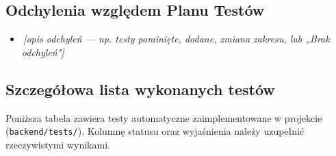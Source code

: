 \documentclass[11pt,a4paper]{article}
\newcommand{\luka}[1]{\colorbox{lukacol}{\,\textit{[#1]}\,}}
\begin{document}
\subsection{Odchylenia względem Planu Testów}
\begin{itemize}
  \item \luka{opis odchyleń — np. testy pominięte, dodane, zmiana zakresu, lub „Brak odchyleń"}
\end{itemize}

\subsection{Szczegółowa lista wykonanych testów}
Poniższa tabela zawiera testy automatyczne zaimplementowane w projekcie (\texttt{backend/tests/}). Kolumnę statusu oraz wyjaśnienia należy uzupełnić rzeczywistymi wynikami.
\end{document}
